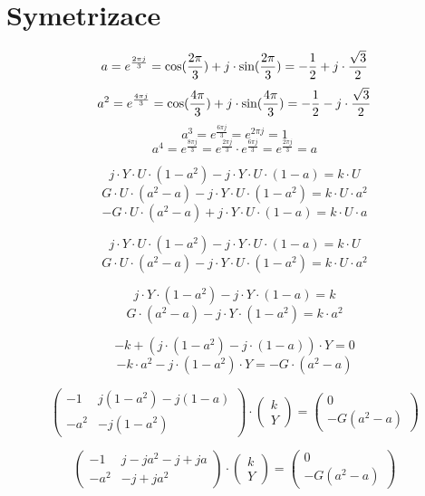 \documentclass{article}
\begin{document}
\maketitle
\tableofcontents
\newpage



\section{Symetrizace \spicy \spicy}

$$
    a = e^{\frac{2 \pi j}{3}} = \textrm{cos}(\frac{2 \pi}{3}) + j \cdot \textrm{sin}(\frac{2 \pi}{3}) = -\frac{1}{2} + j \cdot \frac{\sqrt{3}}{2}
$$
$$
    a^2 = e^{\frac{4 \pi j}{3}} = \textrm{cos}(\frac{4 \pi}{3}) + j \cdot \textrm{sin}(\frac{4 \pi}{3}) = -\frac{1}{2} - j \cdot \frac{\sqrt{3}}{2}
$$
$$
    a^3 = e^{\frac{6 \pi j}{3}} = e^{2 \pi j} = 1
$$
$$
    a^4 = e^{\frac{8 \pi j}{3}} = e^{\frac{2 \pi j}{3}} \cdot e^{\frac{6 \pi j}{3}} = e^{\frac{2 \pi j}{3}} = a
$$

$$
    j \cdot Y \cdot U \cdot (1 - a^2) - j \cdot Y \cdot U \cdot (1 - a) = k \cdot U
$$
$$
    G \cdot U \cdot (a^2 - a) - j \cdot Y \cdot U \cdot (1 - a^2) = k \cdot U \cdot a^2
$$
$$
    -G \cdot U \cdot (a^2 - a) + j \cdot Y \cdot U \cdot (1 - a) = k \cdot U \cdot a
$$

$$
    j \cdot Y \cdot U \cdot (1 - a^2) - j \cdot Y \cdot U \cdot (1 - a) = k \cdot U
$$
$$
    G \cdot U \cdot (a^2 - a) - j \cdot Y \cdot U \cdot (1 - a^2) = k \cdot U \cdot a^2
$$

$$
    j \cdot Y \cdot (1 - a^2) - j \cdot Y \cdot (1 - a) = k
$$
$$
    G \cdot (a^2 - a) - j \cdot Y \cdot (1 - a^2) = k \cdot a^2
$$

$$
    -k + \left( j \cdot (1 - a^2) - j \cdot (1 - a) \right) \cdot Y = 0
$$
$$
    -k \cdot a^2 - j \cdot (1 - a^2) \cdot Y = -G \cdot (a^2 - a)
$$

$$
    \begin{pmatrix}
        -1   & j (1 - a^2) - j (1 - a) \\
        -a^2 & - j (1 - a^2)
    \end{pmatrix}
    \cdot
    \begin{pmatrix}
        k \\
        Y
    \end{pmatrix}
    =
    \begin{pmatrix}
        0 \\
        -G (a^2 - a)
    \end{pmatrix}
$$

$$
    \begin{pmatrix}
        -1   & j - j a^2 - j + j a \\
        -a^2 & - j + j a^2
    \end{pmatrix}
    \cdot
    \begin{pmatrix}
        k \\
        Y
    \end{pmatrix}
    =
    \begin{pmatrix}
        0 \\
        - G (a^2 - a)
    \end{pmatrix}
$$
\end{document}
